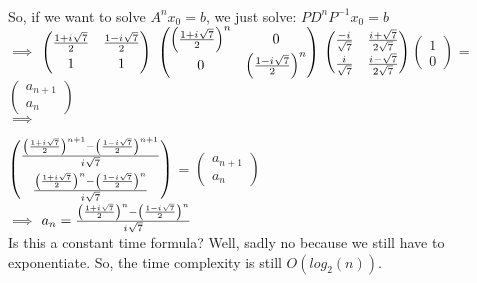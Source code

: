 \documentclass{article}
\newcommand{\iu}{{i\mkern1mu}}
\begin{document}
		\paragraph{}
            So, if we want to solve $A^nx_0 = b$, we just solve:
            $PD^nP^{-1}x_0 = b$\\[12pt]
            $\implies $ \(\begin{pmatrix}\frac{1 + \iu\sqrt{7}}{2} & \frac{1 - \iu\sqrt{7}}{2}\\[3pt] 1 & 1\end{pmatrix}\)
                    	\(\begin{pmatrix}\left(\frac{1 + \iu\sqrt{7}}{2}\right)^n & 0\\0 & \left(\frac{1 - \iu\sqrt{7}}{2}\right)^n\end{pmatrix}\)
                         \(\begin{pmatrix}\frac{-\iu}{\sqrt{7}} & \frac{\iu + \sqrt{7}}{2\sqrt{7}} \\[3pt] \frac{\iu}{\sqrt{7}} & \frac{\iu - \sqrt{7}}{2\sqrt{7}}\end{pmatrix}\)\(\begin{pmatrix}1\\0\end{pmatrix}\) = \(\begin{pmatrix}a_{n+1}\\a_{n}\end{pmatrix}\) \\[12pt]
            $\implies $  
                         
                \(\begin{pmatrix}\frac{\left(\frac{1 + \iu\sqrt{7}}{2}\right)^{n+1} - \left(\frac{1 - \iu\sqrt{7}}{2}\right)^{n+1}}{\iu\sqrt{7}}\\[6pt]
                \frac{\left(\frac{1 + \iu\sqrt{7}}{2}\right)^{n} - \left(\frac{1 - \iu\sqrt{7}}{2}\right)^{n}}{\iu\sqrt{7}}\end{pmatrix}\) =
                \(\begin{pmatrix}a_{n+1}\\a_{n}\end{pmatrix}\) \\[12pt]
            $ \implies$
            $a_{n} = \frac{\left(\frac{1 + \iu\sqrt{7}}{2}\right)^{n} - \left(\frac{1 - \iu\sqrt{7}}{2}\right)^{n}}{\iu\sqrt{7}}$\\[12pt]
       Is this a constant time formula? Well, sadly no because we still have to exponentiate. So, the time complexity is still $O(log_2(n))$.
       
\end{document}
